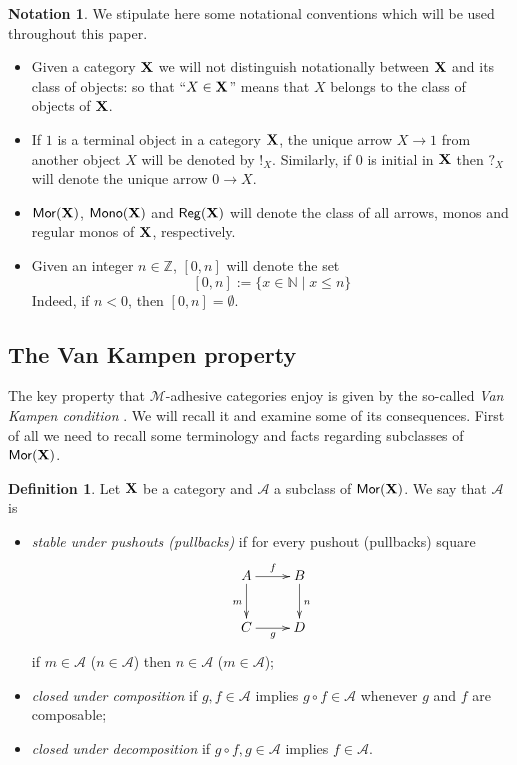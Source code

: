 \documentclass[a4paper]{article}
\newcommand{\mor}{\mathsf{Mor}}
\newcommand{\mon}{\mathsf{Mono}}
\newcommand{\reg}{\mathsf{Reg}}
\def\X{\textbf {\textup{X}}}
\def\Set{\textbf {\textup{Set}}}
\theoremstyle{definition}
\newtheorem{definition}[theorem]{Definition}
\newtheorem*{notation}{Notation}
\begin{document}
\begin{notation} 
We stipulate here some notational conventions which will be used throughout this paper. 
\begin{itemize}\item 
	Given a category $\X$ we will not distinguish notationally between $\X$ and its class of objects: so that ``$X\in \X$'' means that $X$ belongs to the class of objects of $\X$.  
	\item 
	If $1$ is a terminal object in a category $\X$,  the unique arrow $X\to 1$ from another object $X$ will be denoted by $!_X$. Similarly, if $0$ is initial in $\X$ then $?_X$ will denote the unique arrow $0\to X$. %
	\item  $\mor(\X)$, $\mon(\X)$ and $\reg(\X)$ will denote the class of all arrows, monos and regular monos of $\X$, respectively.
	
	\item Given an integer $n\in \mathbb{Z}$, $[0,n]$ will denote the set
	\[[0,n]:=\{x\in \mathbb{N}\mid x\leq n\}\]
	Indeed, if $n<0$, then $[0,n]=\emptyset$.
\end{itemize}
\end{notation}


\subsection{The Van Kampen property}
The key property that $\mathcal{M}$-adhesive categories enjoy is given by  the so-called \emph{Van Kampen condition} \cite{brown1997van,johnstone2007quasitoposes,lack2005adhesive}. We will recall it and examine some of its consequences. First of all we need to recall some terminology and facts regarding subclasses of $\mor(\X)$.

\begin{definition}
	Let $\X$ be a category and $\mathcal{A}$ a  subclass of $\mor(\X)$. We say that  $\mathcal{A}$ is
	\begin{itemize}
		\item 
		\emph{stable under pushouts (pullbacks)} if for every pushout (pullbacks) square 
		\[\xymatrix{A\ar[r]^f  \ar[d]_{m}& B \ar[d]^n \\ C \ar[r]_g & D}\]
		if $m \in \mathcal{A}$ ($n\in \mathcal{A}$) then $n \in \mathcal{A}$ ($m \in \mathcal{A}$);
		\item \emph{closed under composition} if $g, f\in \mathcal{A}$ implies $g\circ f\in \mathcal{A}$ whenever $g$ and $f$ are composable;
		\item \emph{closed under decomposition} if $g\circ f, g\in \mathcal{A}$ implies $f\in \mathcal{A}$.
	\end{itemize}
\end{definition}
\end{document}
